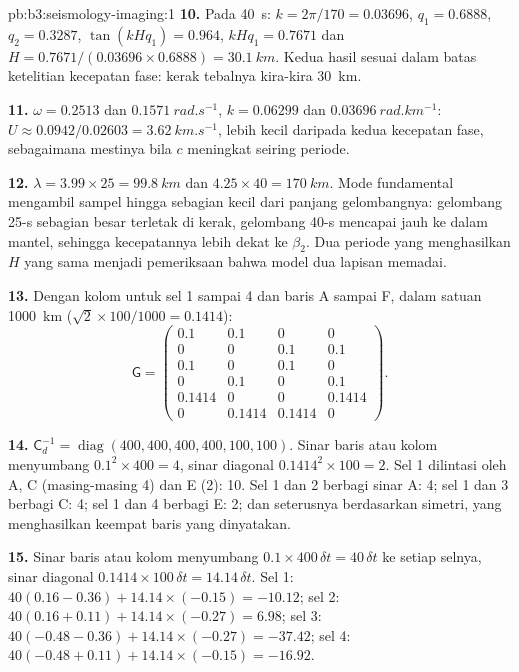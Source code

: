 \begin{solution}{pb:b3:seismology-imaging:1}
\textbf{10.} Pada \qty{40}{s}: $k = 2\pi/170 = 0.03696$, $q_1 = 0.6888$,
$q_2 = 0.3287$, $\tan(kHq_1) = 0.964$, $kHq_1 = 0.7671$ dan
$H = 0.7671/(0.03696\times0.6888) = \qty{30.1}{km}$. Kedua hasil sesuai dalam batas
ketelitian kecepatan fase: kerak tebalnya kira-kira \qty{30}{km}.

\textbf{11.} $\omega = 0.2513$ dan $\qty{0.1571}{rad.s^{-1}}$, $k = 0.06299$ dan
$\qty{0.03696}{rad.km^{-1}}$: $U \approx 0.0942/0.02603 = \qty{3.62}{km.s^{-1}}$,
lebih kecil daripada kedua kecepatan fase, sebagaimana mestinya bila $c$ meningkat seiring
periode.

\textbf{12.} $\lambda = 3.99\times25 = \qty{99.8}{km}$ dan $4.25\times40 =
\qty{170}{km}$. Mode fundamental mengambil sampel hingga sebagian kecil dari
panjang gelombangnya: gelombang 25-s sebagian besar terletak di kerak, gelombang 40-s mencapai jauh
ke dalam mantel, sehingga kecepatannya lebih dekat ke $\beta_2$. Dua periode yang menghasilkan
$H$ yang sama menjadi pemeriksaan bahwa model dua lapisan memadai.

\textbf{13.} Dengan kolom untuk sel 1 sampai 4 dan baris A sampai F, dalam
satuan \qty{1000}{km} ($\sqrt2\times100/1000 = 0.1414$):
\[
  \mathsf G = \begin{pmatrix}
  0.1 & 0.1 & 0 & 0 \\ 0 & 0 & 0.1 & 0.1 \\ 0.1 & 0 & 0.1 & 0 \\
  0 & 0.1 & 0 & 0.1 \\ 0.1414 & 0 & 0 & 0.1414 \\ 0 & 0.1414 & 0.1414 & 0
  \end{pmatrix}.
\]

\textbf{14.} $\mathsf C_d^{-1} = \operatorname{diag}(400, 400, 400, 400, 100,
100)$. Sinar baris atau kolom menyumbang $0.1^2\times400 = 4$, sinar diagonal
$0.1414^2\times100 = 2$. Sel 1 dilintasi oleh A, C (masing-masing 4) dan E (2): 10. Sel
1 dan 2 berbagi sinar A: 4; sel 1 dan 3 berbagi C: 4; sel 1 dan 4 berbagi E: 2; dan
seterusnya berdasarkan simetri, yang menghasilkan keempat baris yang dinyatakan.

\textbf{15.} Sinar baris atau kolom menyumbang $0.1\times400\,\delta t = 40\,
\delta t$ ke setiap selnya, sinar diagonal $0.1414\times100\,\delta t =
14.14\,\delta t$. Sel 1: $40(0.16 - 0.36) + 14.14\times(-0.15) = -10.12$; sel
2: $40(0.16 + 0.11) + 14.14\times(-0.27) = 6.98$; sel 3: $40(-0.48 - 0.36) +
14.14\times(-0.27) = -37.42$; sel 4: $40(-0.48 + 0.11) + 14.14\times(-0.15) =
-16.92$.


\end{solution}
